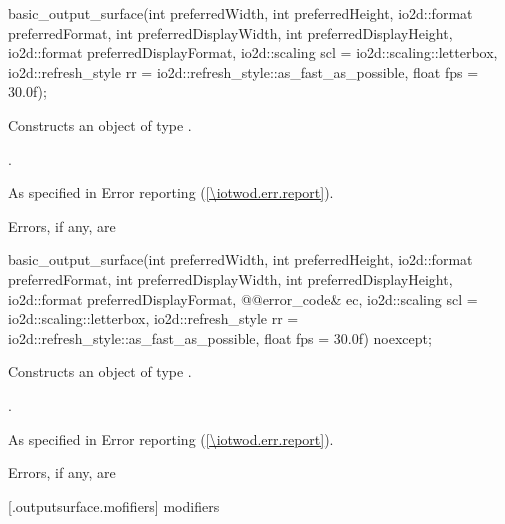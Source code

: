 %
\begin{itemdecl}
basic_output_surface(int preferredWidth, int preferredHeight,
  io2d::format preferredFormat, int preferredDisplayWidth,
  int preferredDisplayHeight, io2d::format preferredDisplayFormat,
  io2d::scaling scl = io2d::scaling::letterbox,
  io2d::refresh_style rr = io2d::refresh_style::as_fast_as_possible,
  float fps = 30.0f);
\end{itemdecl}
\begin{itemdescr}
\pnum
\effects Constructs an object of type .

\pnum
\postconditions {}.

\pnum
\throws As specified in Error reporting (\ref{\iotwod.err.report}).

\pnum
\errors Errors, if any, are 
\end{itemdescr}

%
\begin{itemdecl}
basic_output_surface(int preferredWidth, int preferredHeight,
  io2d::format preferredFormat, int preferredDisplayWidth,
  int preferredDisplayHeight, io2d::format preferredDisplayFormat,
  @\stdqualifier{}@error_code& ec, io2d::scaling scl = io2d::scaling::letterbox,
  io2d::refresh_style rr = io2d::refresh_style::as_fast_as_possible,
  float fps = 30.0f) noexcept;
\end{itemdecl}
\begin{itemdescr}
\pnum
\effects Constructs an object of type .

\pnum
\postconditions {}.

\pnum
\throws As specified in Error reporting (\ref{\iotwod.err.report}).

\pnum
\errors Errors, if any, are 
\end{itemdescr}


 [\iotwod.outputsurface.mofifiers] { modifiers}

